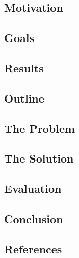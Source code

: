 \documentclass[12pt]{article}
\begin{document}


\vspace{3cm}

\subsection*{Motivation}

\subsection*{Goals}

\subsection*{Results}

\subsection*{Outline}

\subsection*{The Problem}

\subsection*{The Solution}

\subsection*{Evaluation}

\subsection*{Conclusion}

\subsection*{References}
\end{document}
